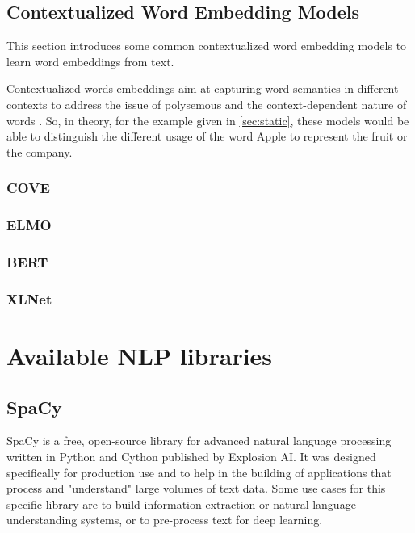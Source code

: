     \subsection{Contextualized Word Embedding Models}

        \par This section introduces some common contextualized word embedding models to learn word embeddings from text.
        
        \par Contextualized words embeddings aim at capturing word semantics in different contexts to address the issue of polysemous and the context-dependent nature of words \cite{Batista2018}. So, in theory, for the example given in  \ref{sec:static}, these models would be able to distinguish the different usage of the word Apple to represent the fruit or the company.



        \subsubsection{COVE}
        \subsubsection{ELMO}
        \subsubsection{BERT}
        \subsubsection{XLNet}
        

       
\section{Available NLP libraries}


        \subsection{SpaCy}
        
        \par SpaCy is a free, open-source library for advanced natural language processing written in Python and Cython published by Explosion AI. It was designed specifically for production use and to help in the building of applications that process and "understand" large volumes of text data.  Some use cases for this specific library are to build information extraction or natural language understanding systems, or to pre-process text for deep learning. \cite{Spacy2017}

